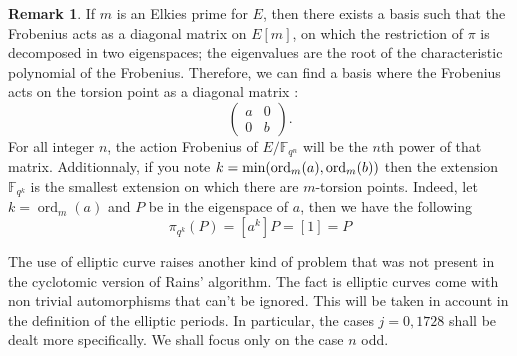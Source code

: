 \documentclass[12pt]{article}
\theoremstyle{plain}
\theoremstyle{definition}
\newtheorem*{remark}{Remark}
\DeclareMathOperator{\order}{ord} %
\def\F{\ensuremath{\mathbb{F}}}
\newcounter{algorithm}
\begin{document}
\begin{remark}
If $m$ is an Elkies prime for $E$, then there exists a basis such that the 
Frobenius acts as a diagonal matrix on $E[m]$, on which the restriction of
$\pi$ is decomposed in two eigenspaces; the eigenvalues are the root of the 
characteristic polynomial of the Frobenius. Therefore, we can find a basis where
the Frobenius acts on the torsion point as a diagonal matrix :
\begin{equation}
\begin{pmatrix}
a & 0\\
0 & b
\end{pmatrix}.
\end{equation}
For all integer $n$, the action Frobenius of $E/\F_{q^n}$ will be the $n$th
power of that matrix. Additionnaly, if you note $k =
\textup{min}(\order_m(a),\order_m(b))$ then the extension $\F_{q^k}$ is
the smallest extension on which there are $m$-torsion points. Indeed, let $k = 
\order_m(a)$ and $P$ be in the eigenspace of $a$, then we have the following
\begin{equation}
\pi_{q^k}(P) = [a^k]P = [1] = P
\end{equation}
\end{remark}

The use of elliptic curve raises another kind of problem that was not present 
in the cyclotomic version of Rains' algorithm. The fact is elliptic curves 
come with non trivial automorphisms that can't be ignored. This will be taken 
in account in the definition of the elliptic periods. In particular, the cases 
$j = 0, 1728$ shall be dealt more specifically. We shall focus only on the case
$n$ odd.
\end{document}
